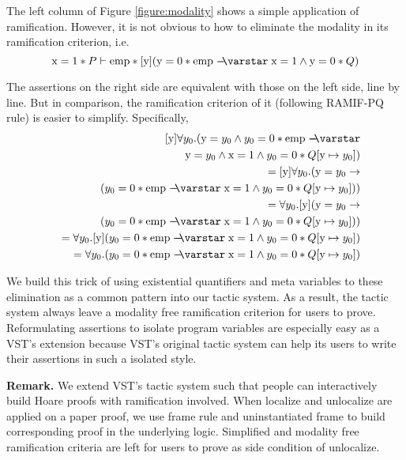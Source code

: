 The left column of Figure \ref{figure:modality} shows a simple application of ramification. However, it is not obvious to how to eliminate the modality in its ramification criterion, i.e.
$$\mathrm{x} = 1 * P \vdash \mathrm{emp} * [\mathrm{y}](\mathrm{y} = 0 * \mathrm{emp} \wand \mathrm{x} = 1 \wedge \mathrm{y} = 0 * Q)$$

The assertions on the right side are equivalent with those on the left side, line by line. But in comparison, the ramification criterion of it (following RAMIF-PQ rule) is easier to simplify. Specifically,
\begin{eqnarray*}
&&~~~~[\mathrm{y}]\forall y_0. (\mathrm{y} = y_0 \wedge y_0 = 0 * \mathrm{emp} \wand \\
&& ~~~~~~~~~   \mathrm{y} = y_0 \wedge \mathrm{x} = 1  \wedge y_0 = 0 * Q[\mathrm{y} \mapsto y_0]) \\
&&= [\mathrm{y}]\forall y_0. (\mathrm{y} = y_0 \to \\
&& ~~~~~~~~~ (y_0 = 0 * \mathrm{emp} \wand \mathrm{x} = 1  \wedge y_0 = 0 * Q[\mathrm{y} \mapsto y_0])) \\
&&= \forall y_0. [\mathrm{y}](\mathrm{y} = y_0 \to \\
&& ~~~~~~~~~ (y_0 = 0 * \mathrm{emp} \wand \mathrm{x} = 1  \wedge y_0 = 0 * Q[\mathrm{y} \mapsto y_0])) \\
&&= \forall y_0. [\mathrm{y}](y_0 = 0 * \mathrm{emp} \wand \mathrm{x} = 1  \wedge y_0 = 0 * Q[\mathrm{y} \mapsto y_0]) \\
&&= \forall y_0. (y_0 = 0 * \mathrm{emp} \wand \mathrm{x} = 1  \wedge y_0 = 0 * Q[\mathrm{y} \mapsto y_0])
\end{eqnarray*}

We build this trick of using existential quantifiers and meta variables to these elimination as a common pattern into our tactic system. As a result, the tactic system always leave a modality free ramification criterion for users to prove. Reformulating assertions to isolate program variables are especially easy as a VST's extension because VST's original tactic system can help its users to write their assertions in such a isolated style.

\textbf{Remark.} We extend VST's tactic system such that people can interactively build Hoare proofs with ramification involved. When localize and unlocalize are applied on a paper proof, we use frame rule and uninstantiated frame to build corresponding proof in the underlying logic. Simplified and modality free ramification criteria are left for users to prove as side condition of unlocalize.


